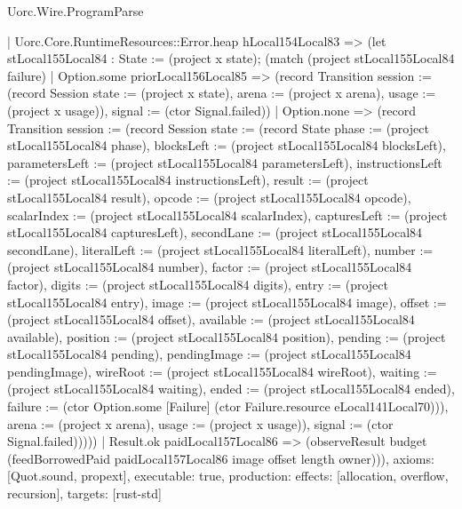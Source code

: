 \begin{lexlean}{Uorc.Wire.ProgramParse}
\begin{semanticmodule}
{      | Uorc.Core.RuntimeResources::Error.heap hLocal154Local83 => (let stLocal155Local84 : State := (project x state); (match (project stLocal155Local84 failure)
        | Option.some priorLocal156Local85 => (record Transition {session := (record Session {state := (project x state), arena := (project x arena), usage := (project x usage)}), signal := (ctor Signal.failed)})
        | Option.none => (record Transition {session := (record Session {state := (record State {phase := (project stLocal155Local84 phase), blocksLeft := (project stLocal155Local84 blocksLeft), parametersLeft := (project stLocal155Local84 parametersLeft), instructionsLeft := (project stLocal155Local84 instructionsLeft), result := (project stLocal155Local84 result), opcode := (project stLocal155Local84 opcode), scalarIndex := (project stLocal155Local84 scalarIndex), capturesLeft := (project stLocal155Local84 capturesLeft), secondLane := (project stLocal155Local84 secondLane), literalLeft := (project stLocal155Local84 literalLeft), number := (project stLocal155Local84 number), factor := (project stLocal155Local84 factor), digits := (project stLocal155Local84 digits), entry := (project stLocal155Local84 entry), image := (project stLocal155Local84 image), offset := (project stLocal155Local84 offset), available := (project stLocal155Local84 available), position := (project stLocal155Local84 position), pending := (project stLocal155Local84 pending), pendingImage := (project stLocal155Local84 pendingImage), wireRoot := (project stLocal155Local84 wireRoot), waiting := (project stLocal155Local84 waiting), ended := (project stLocal155Local84 ended), failure := (ctor Option.some [Failure] (ctor Failure.resource eLocal141Local70))}), arena := (project x arena), usage := (project x usage)}), signal := (ctor Signal.failed)}))))
    | Result.ok paidLocal157Local86 => (observeResult budget (feedBorrowedPaid paidLocal157Local86 image offset length owner))),
  axioms: [Quot.sound, propext],
  executable: true,
  production: {effects: [allocation, overflow, recursion], targets: [rust-std]}
}


\end{semanticmodule}
\end{lexlean}
